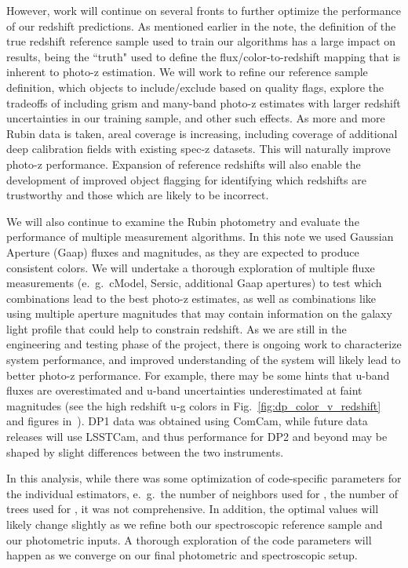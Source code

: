 However, work will continue on several fronts to further optimize the performance of our redshift predictions.  As mentioned earlier in the note, the definition of the true redshift reference sample used to train our algorithms has a large impact on results, being the ``truth" used to define the flux/color-to-redshift mapping that is inherent to photo-z estimation.  We will work to refine our reference sample definition, which objects to include/exclude based on quality flags, explore the tradeoffs of including grism and many-band photo-z estimates with larger redshift uncertainties in our training sample, and other such effects.  As more and more Rubin data is taken, areal coverage is increasing, including coverage of additional deep calibration fields with existing spec-z datasets.  This will naturally improve photo-z performance.  Expansion of reference redshifts will also enable the development of improved object flagging for identifying which redshifts are trustworthy and those which are likely to be incorrect.

We will also continue to examine the Rubin photometry and evaluate the performance of multiple measurement algorithms.  In this note we used Gaussian Aperture (Gaap) fluxes and magnitudes, as they are expected to produce consistent colors.  We will undertake a thorough exploration of multiple fluxe measurements (e.~g.~cModel, Sersic, additional Gaap apertures) to test which combinations lead to the best photo-z estimates, as well as combinations like using multiple aperture magnitudes that may contain information on the galaxy light profile that could help to constrain redshift.  As we are still in the engineering and testing phase of the project, there is ongoing work to characterize system performance, and improved understanding of the system will likely lead to better photo-z performance.  For example, there may be some hints that u-band fluxes are overestimated and u-band uncertainties underestimated at faint magnitudes (see the high redshift u-g colors in Fig.~\ref{fig:dp_color_v_redshift} and figures in~\citet{RTN:095}).  DP1 data was obtained using ComCam, while future data releases will use LSSTCam, and thus performance for DP2 and beyond may be shaped by slight differences between the two instruments.  

In this analysis, while there was some optimization of code-specific parameters for the individual estimators, e.~g.~the number of neighbors used for , the number of trees used for , it was not comprehensive.  In addition, the optimal values will likely change slightly as we refine both our spectroscopic reference sample and our photometric inputs.  A thorough exploration of the code parameters will happen as we converge on our final photometric and spectroscopic setup.

